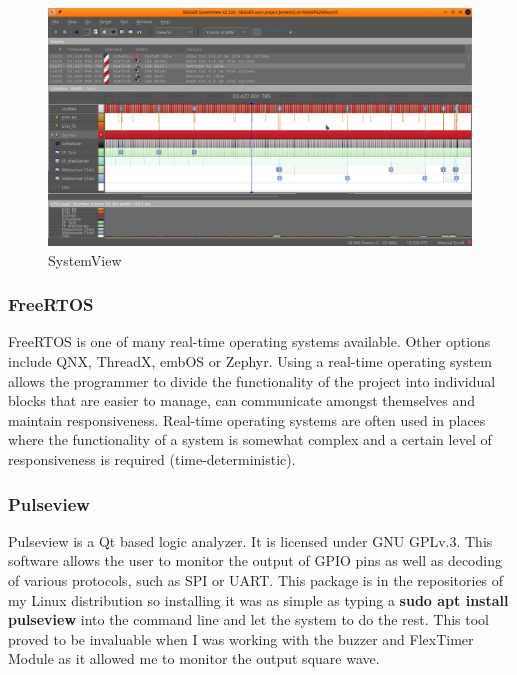 \documentclass[12pt,a4paper]{article}
\begin{document}
            \begin{figure}[h]
                \centering
                \includegraphics[width=\textwidth]{systemview1}
                \caption{SystemView}
            \end{figure}
        
            \subsubsection{FreeRTOS}
            FreeRTOS is one of many real-time operating systems available. Other options include QNX, 
            ThreadX, embOS or Zephyr. Using a real-time operating system allows the programmer to 
            divide the functionality of the project into individual blocks that are easier to manage, 
            can communicate amongst themselves and maintain responsiveness. Real-time operating
            systems are often used in places where the functionality of a system is somewhat complex and a certain level of responsiveness is required (time-deterministic).
            
            \subsubsection{Pulseview}
            Pulseview is a Qt based logic analyzer. It is licensed under GNU GPLv.3. This software  
            allows the user to monitor the output of GPIO pins as well as decoding of various protocols,
            such as SPI or UART. This package is in the repositories of my Linux distribution so 
            installing it was as simple as typing a {\bfseries sudo apt install pulseview} into the command line and let the system to do the rest. This tool proved to be invaluable when 
            I was working with the buzzer and FlexTimer Module as it allowed me to monitor the output
            square wave.
            
\end{document}
